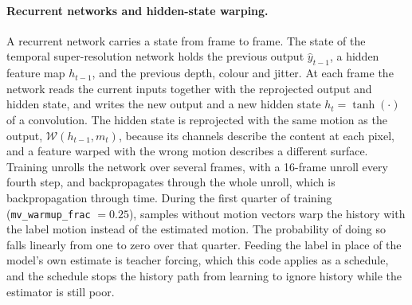 \paragraph{Recurrent networks and hidden-state warping.} A recurrent network carries a state from frame to frame. The state of the temporal super-resolution network holds the previous output $\hat y_{t-1}$, a hidden feature map $h_{t-1}$, and the previous depth, colour and jitter. At each frame the network reads the current inputs together with the reprojected output and hidden state, and writes the new output and a new hidden state $h_t=\tanh(\cdot)$ of a convolution. The hidden state is reprojected with the same motion as the output, $\mathcal W(h_{t-1},m_t)$, because its channels describe the content at each pixel, and a feature warped with the wrong motion describes a different surface. Training unrolls the network over several frames, with a 16-frame unroll every fourth step, and backpropagates through the whole unroll, which is backpropagation through time. During the first quarter of training (\texttt{mv\_warmup\_frac} $=0.25$), samples without motion vectors warp the history with the label motion instead of the estimated motion. The probability of doing so falls linearly from one to zero over that quarter. Feeding the label in place of the model's own estimate is teacher forcing, which this code applies as a schedule, and the schedule stops the history path from learning to ignore history while the estimator is still poor.


